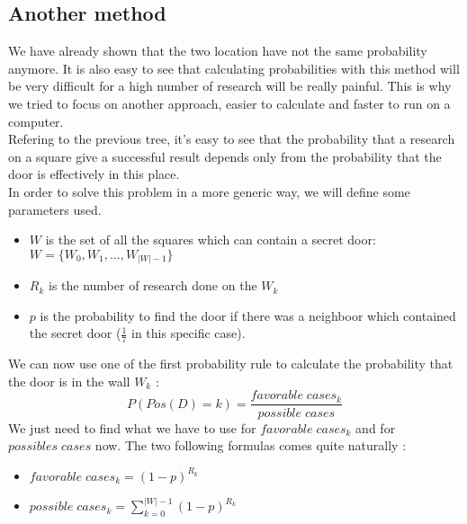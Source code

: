 \documentclass{article}
\begin{document}
\subsection{Another method}
We have already shown that the two location have not the same probability
anymore. It is also easy to see that calculating probabilities with this
method will be very difficult for a high number of research will be really
painful. This is why we tried to focus on another approach, easier to
calculate and faster to run on a computer.\\
Refering to the previous tree, it's easy to see that the probability that a
research on a square give a successful result depends only from the
probability that the door is effectively in this place.
\\
In order to solve this problem in a more generic way, we will define some
parameters used.
\begin{itemize}
\item $W$ is the set of all the squares which can contain a secret door:
  $W = \{W_0,W_1, ... , W_{|W| -1} \}$
\item $R_k$ is the number of research done on the $W_k$
\item $p$ is the probability to find the door if there was a neighboor which
  contained the secret door ($\frac{1}{7}$ in this specific case).
\end{itemize}

We can now use one of the first probability rule to calculate the probability
that the door is in the wall $W_k$ :
$$P(Pos(D) = k) = \frac{favorable\;cases_k}{possible\;cases}$$
We just need to find what we have to use for $favorable\;cases_k$ and for
$possibles\;cases$ now. The two following formulas comes quite naturally :
\begin{itemize}
\item $favorable\;cases_k = (1-p)^{R_k}$
\item $possible\;cases_k = \sum_{k=0}^{|W| - 1} (1-p) ^{R_k}$
\end{itemize}
\end{document}
